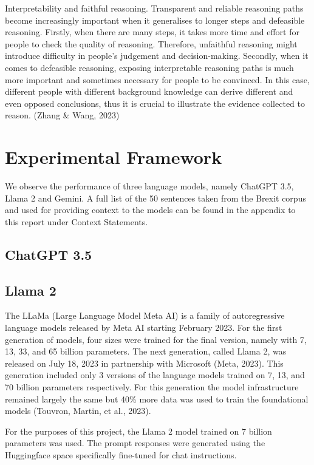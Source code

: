 \documentclass[fleqn,moreauthors,10pt]{ds_report}
\begin{document}
Interpretability and faithful reasoning. Transparent and reliable reasoning paths become increasingly important when it generalises to longer steps and defeasible reasoning. Firstly, when there are many steps, it takes more time and effort for people to check the quality of reasoning. Therefore, unfaithful reasoning might introduce difficulty in people’s judgement and decision-making. Secondly, when it comes to defeasible reasoning, exposing interpretable reasoning paths is much more important and sometimes necessary for people to be convinced. In this case, different people with different background knowledge can derive different and even opposed conclusions, thus it is crucial to illustrate the evidence collected to reason. (Zhang \& Wang, 2023)

\section*{Experimental Framework}

We observe the performance of three language models, namely ChatGPT 3.5, Llama 2 and Gemini. A full list of the 50 sentences taken from the Brexit corpus and used for providing context to the models can be found in the appendix to this report under Context Statements.

\subsection*{ChatGPT 3.5}

\subsection*{Llama 2}

The LLaMa (Large Language Model Meta AI) is a family of autoregressive language models released by Meta AI starting February 2023. For the first generation of models, four sizes were trained for the final version, namely with 7, 13, 33, and 65 billion parameters. The next generation, called Llama 2, was released on July 18, 2023 in partnership with Microsoft (Meta, 2023). This generation included only 3 versions of the language models trained on 7, 13, and 70 billion parameters respectively. For this generation the model infrastructure remained largely the same but 40\% more data was used to train the foundational models (Touvron, Martin, et al., 2023).

For the purposes of this project, the Llama 2 model trained on 7 billion parameters was used. The prompt responses were generated using the Huggingface space specifically fine-tuned for chat instructions.
\end{document}
